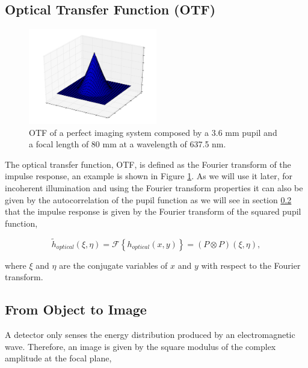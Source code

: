 \subsection{Optical Transfer Function (OTF)}
\label{subsec:OTF}

\begin{figure}
\begin{center}
\includegraphics[width=0.5\textwidth,angle=0]{Figures/OTF}
\decoRule
\caption{OTF of a perfect imaging system composed by a 3.6 mm pupil and a focal length of 80 mm at a wavelength of 637.5 nm.}
\label{fig:OTF}
\end{center}
\end{figure}

The optical transfer function, OTF, is defined as the Fourier transform of the impulse response, an example is shown in Figure \ref{fig:OTF}. As we will use it later, for incoherent illumination and using the Fourier transform properties it can also be given by the autocorrelation of the pupil function as we will see in section \ref{subsec:FromOtoI} that the impulse response is given by the Fourier transform of the squared pupil function,

\begin{equation}
\widetilde{h}_{optical}(\xi,\eta) = \mathcal{F}\left\lbrace h_{optical}(x,y)\right\rbrace = (P \otimes P)(\xi,\eta),
\label{eqt:OTF}
\end{equation}

where $\xi$ and $\eta$ are the conjugate variables of $x$ and $y$ with respect to the Fourier transform.

\subsection{From Object to Image}
\label{subsec:FromOtoI}

A detector only senses the energy distribution produced by an electromagnetic wave. Therefore, an image is given by the square modulus of the complex amplitude at the focal plane,

